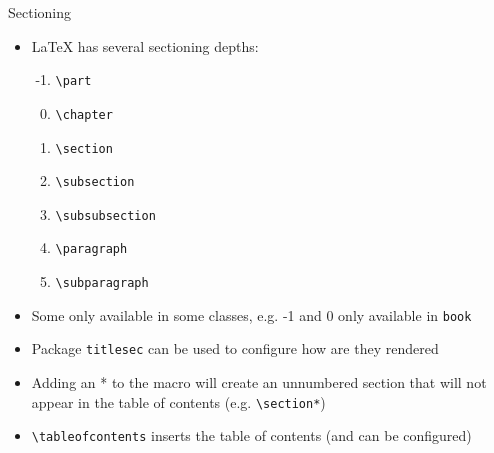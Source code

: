 \documentclass[english]{beamer}
\let\olditem\item
\let\sitem\item%
\renewcommand{\item}{\setlength{\itemsep}{\fill}\olditem}
\let\textttt\texttt
\renewcommand{\texttt}[1]{\colorbox{gray!10}{\textttt{#1}}}
\begin{document}
\begin{frame}[fragile]{Sectioning}
    \begin{itemize}
        \item \LaTeX{} has several sectioning depths:
        \begin{enumerate}\setcounter{enumi}{-2}
            \sitem \verb|\part|
            \sitem \verb|\chapter|
            \sitem \verb|\section|
            \sitem \verb|\subsection|
            \sitem \verb|\subsubsection|
            \sitem \verb|\paragraph|
            \sitem \verb|\subparagraph|
        \vfill\end{enumerate}
        \item Some only available in some classes, e.g. -1 and 0 only available in \texttt{book}
        \item Package \texttt{titlesec} can be used to configure how are they rendered
        \item Adding an * to the macro will create an unnumbered section that will not appear in the table of contents (e.g. \verb|\section*|)
        \item \verb|\tableofcontents| inserts the table of contents (and can be configured)
    \end{itemize}
\end{frame}
\end{document}
